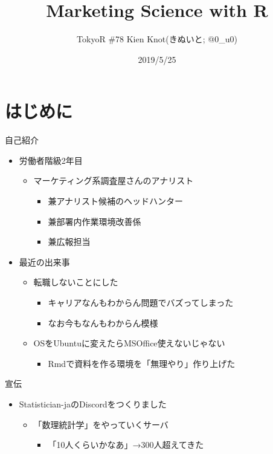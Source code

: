 \documentclass[ignorenonframetext,]{beamer}
\title{Marketing Science with R}
\author{TokyoR \#78 Kien Knot(きぬいと; @0\_u0)}
\date{2019/5/25}
\providecommand{\tightlist}{%
  \setlength{\itemsep}{0pt}\setlength{\parskip}{0pt}}
\begin{document}
\frame{\titlepage}

\section{はじめに}

\begin{frame}{自己紹介}

\begin{itemize}
\tightlist
\item
  労働者階級2年目

  \begin{itemize}
  \tightlist
  \item
    マーケティング系調査屋さんのアナリスト

    \begin{itemize}
    \tightlist
    \item
      兼アナリスト候補のヘッドハンター
    \item
      兼部署内作業環境改善係
    \item
      兼広報担当
    \end{itemize}
  \end{itemize}
\item
  最近の出来事

  \begin{itemize}
  \tightlist
  \item
    転職しないことにした

    \begin{itemize}
    \tightlist
    \item
      キャリアなんもわからん問題でバズってしまった
    \item
      なお今もなんもわからん模様
    \end{itemize}
  \item
    OSをUbuntuに変えたらMSOffice使えないじゃない

    \begin{itemize}
    \tightlist
    \item
      Rmdで資料を作る環境を「無理やり」作り上げた
    \end{itemize}
  \end{itemize}
\end{itemize}

\end{frame}

\begin{frame}{宣伝}

\begin{itemize}
\tightlist
\item
  Statistician-jaのDiscordをつくりました

  \begin{itemize}
  \tightlist
  \item
    「数理統計学」をやっていくサーバ

    \begin{itemize}
    \tightlist
    \item
      「10人くらいかなあ」→300人超えてきた
    \end{itemize}
  \end{itemize}
\end{itemize}

\end{frame}
\end{document}
